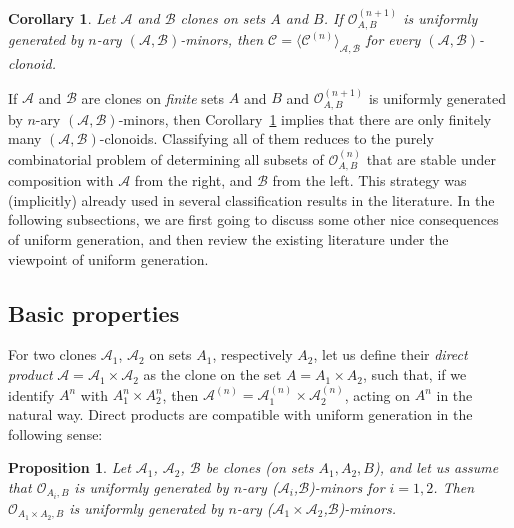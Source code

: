 \documentclass[11pt]{amsart}
\theoremstyle{plain}
\newtheorem{proposition}[thm]{Proposition}
\newtheorem{corollary}[thm]{Corollary}
\theoremstyle{definition}
\newcommand{\clone}[1]{\mathcal{#1}}
\newcommand{\clonoid}[1]{\mathcal{#1}}
\newcommand{\clodC}{\clonoid{C}}
\newcommand{\clodO}{\clonoid{O}}
\newcommand{\cloA}{\clone{A}}
\newcommand{\cloB}{\clone{B}}
\newcommand{\cloO}{\clone{O}}
\begin{document}
\begin{corollary} \label{corollary:unigen}
Let $\cloA$ and $\cloB$ clones on sets $A$ and $B$. If $\cloO_{A,B}^{(n+1)}$ is uniformly generated by $n$-ary $(\cloA, \cloB)$-minors, then $\clodC = \langle \clodC^{(n)} \rangle_{\cloA, \cloB}$ for every $(\cloA, \cloB)$-clonoid.
\end{corollary}

If $\cloA$ and $\cloB$ are clones on \emph{finite} sets $A$ and $B$ and $\cloO_{A,B}^{(n+1)}$ is uniformly generated by $n$-ary $(\cloA, \cloB)$-minors, then Corollary~\ref{corollary:unigen} implies that there are only finitely many $(\cloA, \cloB)$-clonoids. Classifying all of them reduces to the purely combinatorial problem of determining all subsets of $\cloO_{A,B}^{(n)}$ that are stable under composition with $\cloA$ from the right, and $\cloB$ from the left. This strategy was (implicitly) already used in several classification results in the literature. In the following subsections, we are first going to discuss some other nice consequences of uniform generation, and then review the existing literature under the viewpoint of uniform generation.

\subsection{Basic properties}
For two clones $\cloA_1$, $\cloA_2$ on sets $A_1$, respectively $A_2$, let us define their \emph{direct product} $\cloA = \cloA_1 \times \cloA_2$ as the clone on the set $A=A_1\times A_2$, such that, if we identify $A^n $ with $A_1^{n} \times A_2^{n}$, then $\cloA^{(n)} = \cloA_1^{(n)} \times \cloA_2^{(n)}$, acting on $A^n$ in the natural way. Direct products are compatible with uniform generation in the following sense:

\begin{proposition} \label{proposition:ugproduct}
Let $\cloA_1$, $\cloA_2$, $\cloB$ be clones (on sets $A_1,A_2,B$), and let us assume that $\clodO_{A_i,B}$ is uniformly generated by $n$-ary ($\cloA_i$,$\cloB$)-minors for $i=1,2$. 
Then $\clodO_{A_1\times A_2,B}$ is uniformly generated by $n$-ary ($\cloA_1\times \cloA_2$,$\cloB$)-minors.
\end{proposition}
\end{document}
